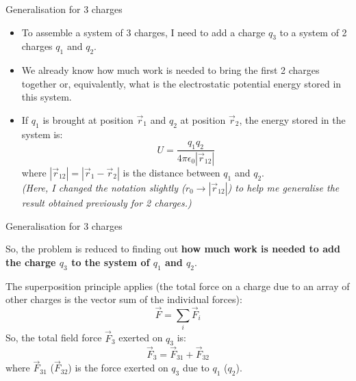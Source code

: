 \begin{frame}{Generalisation for 3 charges}

\begin{itemize}

  \item To assemble a system of 3 charges, I need to add a charge $q_3$ to a system of 2 charges $q_1$ and $q_2$.

  \vspace{0.2cm}
  \item We already know how much work is needed to bring the first 2 charges together
        or, equivalently, what is the electrostatic potential energy stored in this system.

  \vspace{0.2cm}
  \item If $q_1$ is brought at position $\vec{r}_1$ and $q_2$ at position $\vec{r}_2$,
        the energy stored in the system is:
        \begin{equation*}
           U = \frac{q_1 q_2}{4\pi\epsilon_0 |\vec{r}_{12}|}
        \end{equation*}
        where $|\vec{r}_{12}| = |\vec{r}_1 - \vec{r}_2|$ is the distance between $q_1$ and $q_2$.\\
        \vspace{0.2cm}
        {\it (Here, I changed the notation slightly ($r_0 \rightarrow |\vec{r}_{12}|$)
        to help me generalise the result obtained previously for 2 charges.)}
\end{itemize}

\end{frame}

%
%
%

\begin{frame}{Generalisation for 3 charges}

So, the problem is reduced to finding out {\bf how much work is needed
to add the charge $q_3$ to the system of $q_1$ and $q_2$}.\\
\vspace{0.2cm}

The superposition principle applies
(the total force on a charge due to an array of other charges is the vector sum of the individual forces):
\begin{equation*}
  \vec{F} = \sum_{i} \vec{F}_{i}
\end{equation*}
So, the total field force $\vec{F}_{3}$ exerted on $q_3$ is:
\begin{equation*}
  \vec{F}_{3} = \vec{F}_{31} + \vec{F}_{32}
\end{equation*}
where $\vec{F}_{31}$ ($\vec{F}_{32}$) is the force exerted on $q_3$ due to $q_1$ ($q_2$).\\

\end{frame}

